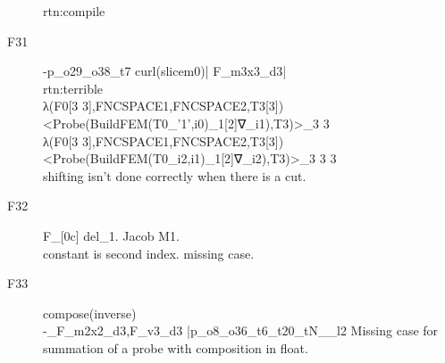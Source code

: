 \begin{description}
	rtn:compile 
	\item[F31]
	-p\_o29\_o38\_t7 curl(slicem0)| F\_m3x3\_d3| \\
	rtn:terrible\\
λ(F0[3 3],FNCSPACE1,FNCSPACE2,T3[3])<Probe(BuildFEM(T0\_{'1',i0})\_1[2]∇\_{i1}),T3)>\_{3 3}\\
λ(F0[3 3],FNCSPACE1,FNCSPACE2,T3[3])<Probe(BuildFEM(T0\_{i2,i1})\_1[2]∇\_{i2}),T3)>\_{3 3 3}\\

shifting isn’t done correctly when there is a cut.
\item[F32]
F\_[0c] del\_1. Jacob M1.\\
constant is second index. missing case.\\
\item[F33]
compose(inverse)\\
-\_F\_m2x2\_d3,F\_v3\_d3 |p\_o8\_o36\_t6\_t20\_tN\_\_l2
Missing case for summation of a probe with composition in float. \\
\end{description}